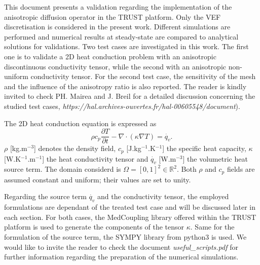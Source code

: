 This document presents a validation regarding the implementation of the anisotropic diffusion operator in the TRUST platform. Only the VEF discretisation is considered in the present work. Different simulations are performed and numerical results at steady-state are compared to analytical solutions for validations. Two test cases are investigated in this work. The first one is to validate a 2D heat conduction problem with an anisotropic discontinuous conductivity tensor, while the second with an anisotropic non-uniform conductivity tensor. For the second test case, the sensitivity of the mesh and the influence of the anisotropy ratio is also reported. The reader is kindly invited to check PH. Mairea and J. Breil for a detailed discussion concerning the studied test cases, \textit{https://hal.archives-ouvertes.fr/hal-00605548/document}).

The 2D heat conduction equation is expressed as
\begin{equation}\label{cond}
\rho c_p \frac{\partial T}{\partial t} - \nabla\cdot (\kappa\nabla T)=\dot{q_v}.
\end{equation}
$\rho$ [kg.m$^{-3}$] denotes the density field, $c_p$ [J.kg$^{-1}$.K$^{-1}$] the specific heat capacity, $\kappa$ [W.K$^{-1}$.m$^{-1}$] the heat conductivity tensor and $\dot{q_v}$ [W.m$^{-3}$] the volumetric heat source term. The domain considerd is $\Omega=[0,1]^2 \in \mathbb{R}^2$. Both $\rho$ and $c_p$ fields are assumed constant and uniform; their values are set to unity. 

Regarding the source term $\dot{q_v}$ and the conductivity tensor, the employed formulations are dependant of the treated test case and will be discussed later in each section. For both cases, the MedCoupling library offered within the TRUST platform is used to generate the components of the tensor $\kappa$. Same for the formulation of the source term, the SYMPY library from python3 is used. We would like to invite the reader to check the document \textit{useful\_scripts.pdf} for further information regarding the preparation of the numerical simulations. 


